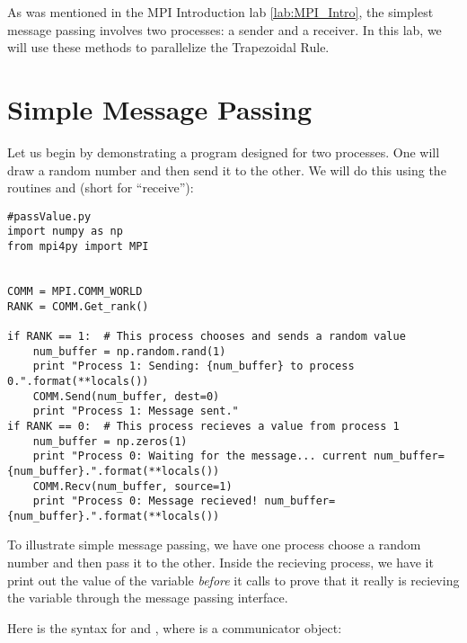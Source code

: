 \label{lab:MPI_Trapezoidal_Rule}

As was mentioned in the MPI Introduction lab \ref{lab:MPI_Intro}, the simplest message passing involves two processes: a sender and a receiver. In this lab, we will use these methods to parallelize the Trapezoidal Rule.

\section*{Simple Message Passing}
Let us begin by demonstrating a program designed for two processes. One will draw a random number and then send it to the other. We will do this using the routines  and  (short for ``receive''):

\begin{lstlisting}
#passValue.py
import numpy as np
from mpi4py import MPI


COMM = MPI.COMM_WORLD
RANK = COMM.Get_rank()

if RANK == 1:  # This process chooses and sends a random value
    num_buffer = np.random.rand(1)
    print "Process 1: Sending: {num_buffer} to process 0.".format(**locals())
    COMM.Send(num_buffer, dest=0)
    print "Process 1: Message sent."
if RANK == 0:  # This process recieves a value from process 1
    num_buffer = np.zeros(1)
    print "Process 0: Waiting for the message... current num_buffer={num_buffer}.".format(**locals())
    COMM.Recv(num_buffer, source=1)
    print "Process 0: Message recieved! num_buffer={num_buffer}.".format(**locals())
\end{lstlisting}

To illustrate simple message passing, we have one process choose a random number and then pass it to the other. Inside the recieving process, we have it print out the value of the variable  \emph{before} it calls  to prove that it really is recieving the variable through the message passing interface.

Here is the syntax for  and , where  is a communicator object:

